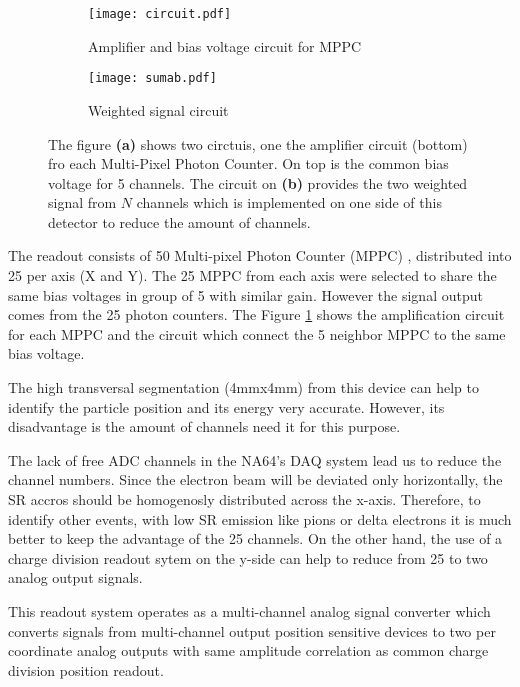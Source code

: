 \begin{figure}[t]
	\hspace*{\fill}
	\centering
	\begin{subfigure}[b]{0.45\textwidth}
	\texttt{[image: circuit.pdf]}
	\caption{Amplifier and bias voltage circuit for MPPC}\label{scheme}
	\end{subfigure}
	\begin{subfigure}[b]{0.45\textwidth}
	\texttt{[image: sumab.pdf]}
	\captionsetup{margin=1cm}
	\caption{Weighted signal circuit}\label{sumab} 
	\end{subfigure}
	\hspace*{\fill}
	\caption{The figure {\bf(a)} shows two circtuis, one the amplifier circuit (bottom) fro each Multi-Pixel Photon Counter. On
	top is the common bias voltage for 5 channels. The circuit on {\bf(b)} provides the two weighted signal from $N$ channels which is
	implemented on one side of this detector to reduce the amount of channels.}\label{circuits}
\end{figure}

The readout consists of 50 Multi-pixel Photon Counter (MPPC) \cite{mppc}, distributed into 25 per axis (X and Y). The 25
MPPC from each axis were selected to share the same bias voltages in group of 5 with similar gain. However the signal
output comes from the 25 photon counters. The Figure \ref{scheme} shows the amplification circuit for each MPPC and the
circuit which connect the 5 neighbor MPPC to the same bias voltage.\par

The high transversal segmentation (4mmx4mm) from this device can help to identify the particle position and its energy
very accurate. However, its disadvantage is the amount of channels need it for this purpose.\par

The lack of free ADC channels in the NA64's DAQ system lead us to reduce the channel numbers. Since the electron beam will
be deviated only horizontally, the SR accros should be homogenosly distributed across the x-axis. Therefore, to identify
other events, with low SR emission like pions or delta electrons it is much better to keep the advantage of the 25
channels. On the other hand, the use of a charge division readout sytem on the y-side can help to reduce from 25 to two
analog output signals. \par

This readout system operates as a multi-channel analog signal converter which converts signals from
multi-channel output position sensitive devices to two per coordinate analog outputs with same amplitude correlation as
common charge division position readout.\par

